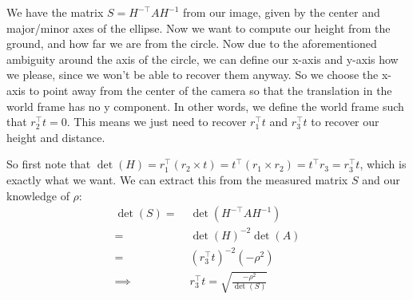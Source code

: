 \documentclass[11pt,english]{article}
\begin{document}
\begin{enumerate}
We have the matrix $S = H^{-\top} A H^{-1}$ from our image, given by the center and major/minor axes of the ellipse.
Now we want to compute our height from the ground, and how far we are from the circle. Now due to 
the aforementioned ambiguity around the axis of the circle, we can define our x-axis and y-axis how we please, since
we won't be able to recover them anyway. So we choose the x-axis to point away from the center of the camera so that
the translation in the world frame has no y component. In other words, we define the world frame such that
$r_2^\top t = 0$. This means we just need to recover $r_1^\top t$ and $r_3^\top t$ to recover our height and 
distance.

So first note that $\det(H) = r_1^\top (r_2 \times t) = t^\top (r_1 \times r_2) = t^\top r_3 = r_3^\top t$, which
is exactly what we want. We can extract this from the measured matrix $S$ and our knowledge of $\rho$:
\begin{align*}
\det(S) =&\; \det(H^{-\top} A H^{-1}) \\
=&\; \det(H)^{-2} \det(A) \\
=&\; (r_3^\top t)^{-2} (-\rho^2) \\
\implies &\; r_3^\top t = \sqrt{\frac{-\rho^2}{\det(S)}}
\end{align*}


\end{enumerate}
\end{document}
